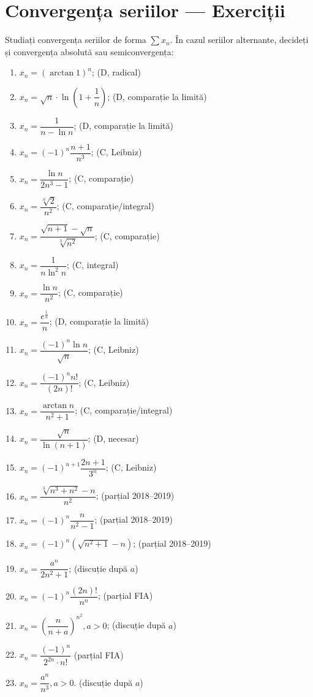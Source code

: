 
\chapter{Convergența seriilor --- Exerciții}

Studiați convergența seriilor de forma $ \sum x_n $. În cazul
seriilor alternante, decideți și convergența absolută sau semiconvergența:
\begin{enumerate}[(1)]
    \item $ x_n = (\arctan 1)^n $; \hfill(D, radical)
    \item $ x_n = \sqrt{n} \cdot \ln \left( 1 + \dfrac{1}{n} \right) $; \hfill(D, comparație la limită)
    \item $ x_n = \dfrac{1}{n - \ln n} $; \hfill(D, comparație la limită)
    \item $ x_n = (-1)^n \dfrac{n + 1}{n^3} $; \hfill(C, Leibniz)
    \item $ x_n = \dfrac{\ln n}{2n^3 - 1} $; \hfill(C, comparație)
    \item $ x_n = \dfrac{\sqrt[n]{2}}{n^2} $; \hfill(C, comparație/integral)
    \item $ x_n = \dfrac{\sqrt{n + 1} - \sqrt{n}}{\sqrt[3]{n^2}} $; \hfill(C, comparație)
    \item $ x_n = \dfrac{1}{n \ln^2 n} $; \hfill(C, integral)
    \item $ x_n = \dfrac{\ln n}{n^2} $; \hfill(C, comparație)
    \item $ x_n = \dfrac{e^\frac{1}{n}}{n} $; \hfill(D, comparație la limită)
    \item $ x_n = \dfrac{(-1)^n \ln n}{\sqrt{n}} $; \hfill(C, Leibniz)
    \item $ x_n = \dfrac{(-1)^n n!}{(2n)!} $; \hfill(C, Leibniz)
    \item $ x_n = \dfrac{\arctan n}{n^2 + 1} $; \hfill(C, comparație/integral)
    \item $ x_n = \dfrac{\sqrt{n}}{\ln(n + 1)} $; \hfill(D, necesar)
    \item $ x_n = (-1)^{n+1} \dfrac{2n + 1}{3^n} $; \hfill(C, Leibniz)
    \item $ x_n = \dfrac{\sqrt[3]{n^3 + n^2} - n}{n^2} $; \hfill(parțial 2018--2019)
    \item $ x_n = (-1)^n \dfrac{n}{n^2 - 1} $; \hfill(parțial 2018--2019)
    \item $ x_n = (-1)^n (\sqrt{n^2 + 1} - n) $; \hfill(parțial 2018--2019)
    \item $ x_n = \dfrac{a^n}{2n^2 + 1} $; \hfill(discuție după $ a $)
    \item $ x_n = (-1)^n \dfrac{(2n)!}{n^n} $; \hfill(parțial FIA)
    \item $ x_n = \left( \dfrac{n}{n + a} \right)^{n^2}, a > 0 $; \hfill(discuție după $ a $)
    \item $ x_n = \dfrac{(-1)^n}{2^{2n} \cdot n!} $ \hfill(parțial FIA)
    \item $ x_n = \dfrac{a^n}{n^3}, a > 0 $. \hfill(discuție după $ a $)
\end{enumerate}
